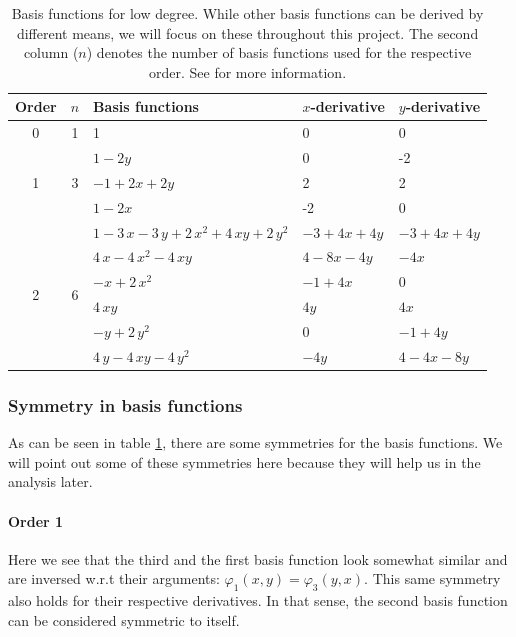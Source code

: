 \documentclass{article}
\renewcommand{\phi}{\varphi}
\begin{document}
\begin{table}[ht]
  \centering
  \begin{tabular}{cclll}
    \toprule
    Order & $n$ & Basis functions & $x$-derivative & $y$-derivative \\
    \midrule
    \multirow{1}{*}{0} & 1 & 1 & 0 & 0\\
    \midrule
    \multirow{3}{*}{1} & \multirow{3}{*}{3} & $1-2y$ & 0 & -2\\
    &  & $-1+2x+2y$ & 2 & 2\\
    &  & $1-2x$ & -2 & 0\\
    \midrule
    \multirow{6}{*}{2} & \multirow{6}{*}{6} & $1-3\,x-3\,y+2\,{x}^{2}+4\,xy+2\,{y}^{2}$ & $-3+4x+4y$ & $-3+4x+4y$\\
& & $4\,x-4\,{x}^{2}-4\,xy$ & $4-8x-4y$ & $-4x$\\
& & $-x+2\,{x}^{2}$ & $-1+4x$ & 0\\
& & $4\,xy$ & $4y$ & $4x$\\
& & $-y+2\,{y}^{2}$ & $0$ & $-1+4y$\\
& & $4\,y-4\,xy-4\,{y}^{2}$ & $-4y$ & $4-4x-8y$ \\
    \bottomrule
  \end{tabular}
  \caption{Basis functions for low degree. While other basis functions can be derived by different means, we will focus on these throughout this project. The second column ($n$) denotes the number of basis functions used for the respective order. See \cite{castro07high-order-ader-fv-dg-numerical-methods,dunavant1985high} for more information.}
  \label{tab:basis-functions-for-low-degrees}
\end{table}

\subsubsection{Symmetry in basis functions}
\label{sec:basis-function-symmetry}

As can be seen in table \ref{tab:basis-functions-for-low-degrees}, there are some symmetries for the basis functions. We will point out some of these symmetries here because they will help us in the analysis later.

\paragraph{Order 1}

Here we see that the third and the first basis function look somewhat similar and are inversed w.r.t their arguments: $\phi_1(x,y)=\phi_3(y,x)$. This same symmetry also holds for their respective derivatives. In that sense, the second basis function can be considered symmetric to itself.
\end{document}
